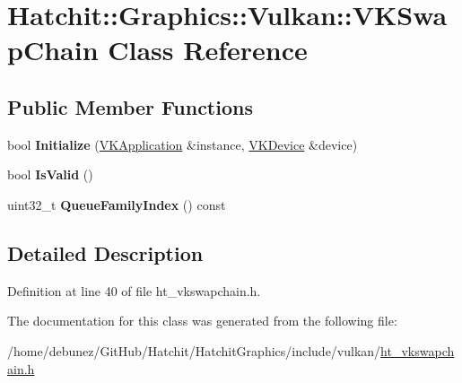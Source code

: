 \hypertarget{classHatchit_1_1Graphics_1_1Vulkan_1_1VKSwapChain}{}\section{Hatchit\+:\+:Graphics\+:\+:Vulkan\+:\+:V\+K\+Swap\+Chain Class Reference}
\label{classHatchit_1_1Graphics_1_1Vulkan_1_1VKSwapChain}
\subsection*{Public Member Functions}
\begin{DoxyCompactItemize}
\item 
bool {\bfseries Initialize} (\hyperlink{classHatchit_1_1Graphics_1_1Vulkan_1_1VKApplication}{V\+K\+Application} \&instance, \hyperlink{classHatchit_1_1Graphics_1_1Vulkan_1_1VKDevice}{V\+K\+Device} \&device)\hypertarget{classHatchit_1_1Graphics_1_1Vulkan_1_1VKSwapChain_acc612461be6adc2d050ae3cda3d8847e}{}\label{classHatchit_1_1Graphics_1_1Vulkan_1_1VKSwapChain_acc612461be6adc2d050ae3cda3d8847e}

\item 
bool {\bfseries Is\+Valid} ()\hypertarget{classHatchit_1_1Graphics_1_1Vulkan_1_1VKSwapChain_ac4e953f89869d2d891742c0f819e9fb2}{}\label{classHatchit_1_1Graphics_1_1Vulkan_1_1VKSwapChain_ac4e953f89869d2d891742c0f819e9fb2}

\item 
uint32\+\_\+t {\bfseries Queue\+Family\+Index} () const \hypertarget{classHatchit_1_1Graphics_1_1Vulkan_1_1VKSwapChain_acf6e58e553959e05ba3e972a407570f7}{}\label{classHatchit_1_1Graphics_1_1Vulkan_1_1VKSwapChain_acf6e58e553959e05ba3e972a407570f7}

\end{DoxyCompactItemize}


\subsection{Detailed Description}


Definition at line 40 of file ht\+\_\+vkswapchain.\+h.



The documentation for this class was generated from the following file\+:\begin{DoxyCompactItemize}
\item 
/home/debunez/\+Git\+Hub/\+Hatchit/\+Hatchit\+Graphics/include/vulkan/\hyperlink{ht__vkswapchain_8h}{ht\+\_\+vkswapchain.\+h}\end{DoxyCompactItemize}
